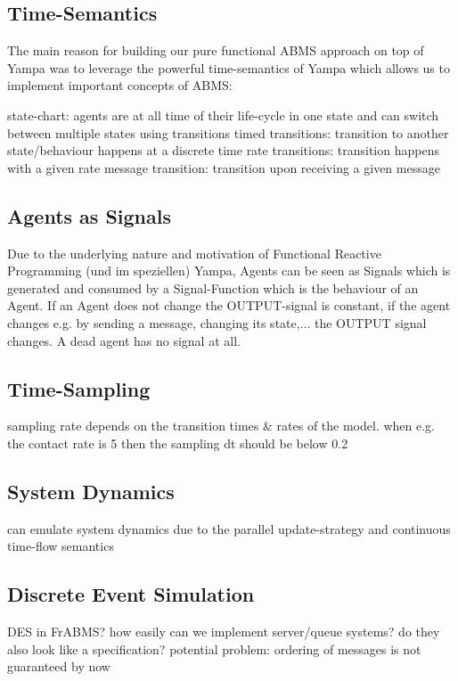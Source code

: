 \subsection{Time-Semantics}
The main reason for building our pure functional ABMS approach on top of Yampa was to leverage the powerful time-semantics of Yampa which allows us to implement important concepts of ABMS:

state-chart: agents are at all time of their life-cycle in one state and can switch between multiple states using transitions 
timed transitions: transition to another state/behaviour happens at a discrete time
rate transitions: transition happens with a given rate
message transition: transition upon receiving a given message 

\subsection{Agents as Signals}
Due to the underlying nature and motivation of Functional Reactive Programming (und im speziellen) Yampa, Agents can be seen as Signals which is generated and consumed by a Signal-Function which is the behaviour of an Agent. If an Agent does not change the OUTPUT-signal is constant, if the agent changes e.g. by sending a message, changing its state,... the OUTPUT signal changes. A dead agent has no signal at all.

\subsection{Time-Sampling}
sampling rate depends on the transition times \& rates of the model. when e.g. the contact rate is 5 then the sampling dt should be below 0.2

\subsection{System Dynamics}
can emulate system dynamics due to the parallel update-strategy and continuous time-flow semantics

\subsection{Discrete Event Simulation}
DES in FrABMS? how easily can we implement server/queue systems? do they also look like a specification? potential problem: ordering of messages is not guaranteed by now